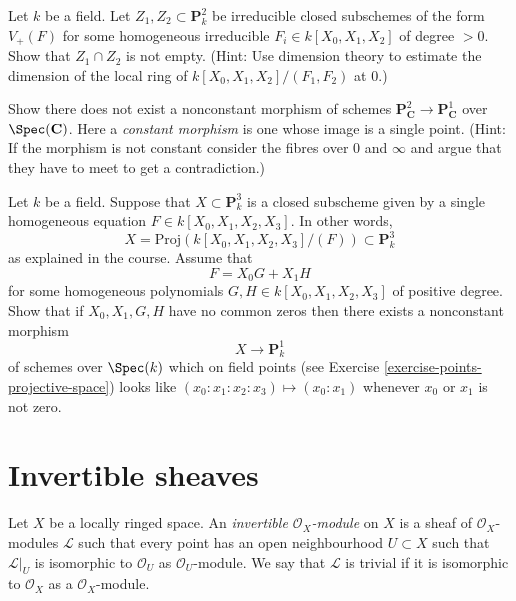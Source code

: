 \begin{exercise}
\label{exercise-bezout}
Let $k$ be a field. Let $Z_1, Z_2 \subset \mathbf{P}^2_k$ be
irreducible closed subschemes of the form $V_{+}(F)$
for some homogeneous irreducible $F_i \in k[X_0, X_1, X_2]$ of degree $> 0$.
Show that $Z_1 \cap Z_2$ is not empty.
(Hint: Use dimension theory to estimate the dimension of
the local ring of $k[X_0, X_1, X_2]/(F_1, F_2)$ at $0$.)
\end{exercise}

\begin{exercise}
\label{exercise-no-nonconstant-morphism-proj}
Show there does not exist a nonconstant morphism of schemes
$\mathbf{P}^2_{\mathbf{C}} \to \mathbf{P}^1_{\mathbf{C}}$
over $\Spec(\mathbf{C})$. Here a {\it constant morphism} is
one whose image is a single point.
(Hint: If the morphism is not constant consider the fibres over
$0$ and $\infty$ and argue that they have to meet to get a contradiction.)
\end{exercise}

\begin{exercise}
\label{exercise-nonconstant-morphism}
Let $k$ be a field.
Suppose that $X \subset \mathbf{P}^3_k$ is a closed subscheme
given by a single homogeneous equation $F \in k[X_0, X_1, X_2, X_3]$.
In other words,
$$
X = \text{Proj}(k[X_0, X_1, X_2, X_3]/(F)) \subset \mathbf{P}^3_k
$$
as explained in the course. Assume that
$$
F = X_0 G + X_1 H
$$
for some homogeneous polynomials $G, H \in k[X_0, X_1, X_2, X_3]$
of positive degree. Show that if $X_0, X_1, G, H$ have no common zeros
then there exists a nonconstant morphism
$$
X \longrightarrow \mathbf{P}^1_k
$$
of schemes over $\Spec(k)$
which on field points (see Exercise \ref{exercise-points-projective-space})
looks like $(x_0 : x_1 : x_2 : x_3) \mapsto (x_0 : x_1)$ whenever
$x_0$ or $x_1$ is not zero.
\end{exercise}





\section{Invertible sheaves}
\label{section-invertible-sheaves}

\begin{definition}
\label{definition-invertible-sheaf}
Let $X$ be a locally ringed space.
An {\it invertible ${\mathcal O}_X$-module} on $X$
is a sheaf of ${\mathcal O}_X$-modules ${\mathcal L}$ such that every point
has an open neighbourhood $U \subset X$ such that ${\mathcal L}|_U$
is isomorphic to ${\mathcal O}_U$ as ${\mathcal O}_U$-module.
We say that ${\mathcal L}$ is trivial if it is isomorphic to
${\mathcal O}_X$ as a ${\mathcal O}_X$-module.
\end{definition}

